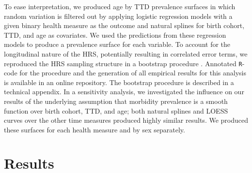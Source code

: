 \documentclass[11pt,oneside,a4paper]{article} %
\begin{document}
To ease interpretation, we produced age by TTD prevalence surfaces in which
random variation is filtered out by applying logistic regression models with a
given binary health measure as the outcome and natural splines for birth cohort,
TTD, and age as covariates. We used the predictions from these regression models
to produce a prevalence surface for each variable. To account for the
longitudinal nature of the HRS, potentially resulting in correlated error terms,
we reproduced the HRS sampling structure in a bootstrap procedure
\citep{efron1994introduction}. Annotated \texttt{R}-code for the procedure and the generation of all empirical results for this analysis is available in an online repository. The bootstrap procedure is described in a technical appendix. In a sensitivity analysis, we investigated the influence on our results of the underlying assumption that morbidity prevalence is a smooth function over birth cohort, TTD, and age; both natural splines and LOESS curves over the other time measures \citep{riffe2015ttd} produced highly similar results. We produced these surfaces for each health measure and by sex separately.
% 







\section{Results}
\end{document}
